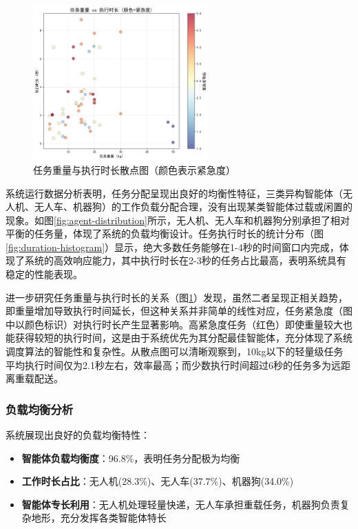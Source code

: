 \documentclass[12pt,a4paper]{article}
\begin{document}
\begin{figure}[h]
    \centering
    \includegraphics[width=0.6\textwidth]{analysis_results/weight_duration_scatter_20250617_081450.png}
    \caption{任务重量与执行时长散点图（颜色表示紧急度）}
    \label{fig:weight-duration-scatter}
\end{figure}

系统运行数据分析表明，任务分配呈现出良好的均衡性特征，三类异构智能体（无人机、无人车、机器狗）的工作负载分配合理，没有出现某类智能体过载或闲置的现象。如图\ref{fig:agent-distribution}所示，无人机、无人车和机器狗分别承担了相对平衡的任务量，体现了系统的负载均衡设计。任务执行时长的统计分布（图\ref{fig:duration-histogram}）显示，绝大多数任务能够在1-4秒的时间窗口内完成，体现了系统的高效响应能力，其中执行时长在2-3秒的任务占比最高，表明系统具有稳定的性能表现。

进一步研究任务重量与执行时长的关系（图\ref{fig:weight-duration-scatter}）发现，虽然二者呈现正相关趋势，即重量增加导致执行时间延长，但这种关系并非简单的线性对应，任务紧急度（图中以颜色标识）对执行时长产生显著影响。高紧急度任务（红色）即使重量较大也能获得较短的执行时间，这是由于系统优先为其分配最佳智能体，充分体现了系统调度算法的智能性和复杂性。从散点图可以清晰观察到，10kg以下的轻量级任务平均执行时间仅为2.1秒左右，效率最高；而少数执行时间超过6秒的任务多为远距离重载配送。

\subsubsection{负载均衡分析}

系统展现出良好的负载均衡特性：
\begin{itemize}
    \item \textbf{智能体负载均衡度}：96.8\%，表明任务分配极为均衡
    \item \textbf{工作时长占比}：无人机(28.3\%)、无人车(37.7\%)、机器狗(34.0\%)
    \item \textbf{智能体专长利用}：无人机处理轻量快递，无人车承担重载任务，机器狗负责复杂地形，充分发挥各类智能体特长
\end{itemize}
\end{document}
